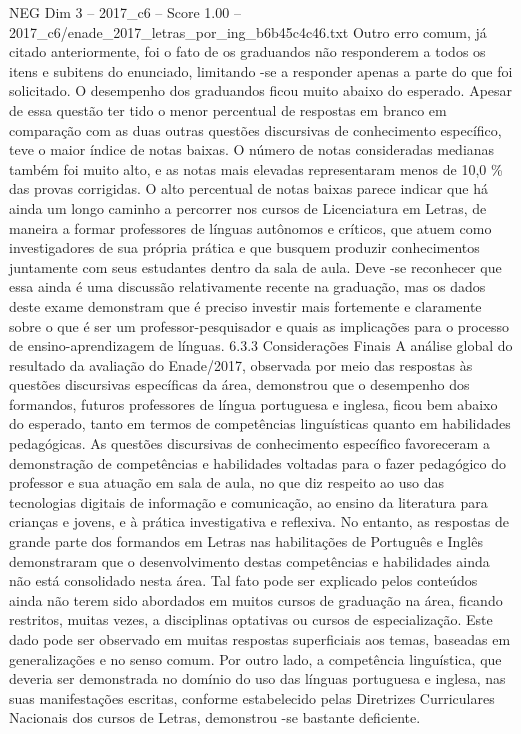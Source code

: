 \begin{textsample}{NEG Dim 3 – 2017\_c6 – Score 1.00 – 2017\_c6/enade\_2017\_letras\_por\_ing\_b6b45c4c46.txt}
Outro erro comum, já citado anteriormente, foi o fato de os graduandos não responderem a todos os itens e subitens do enunciado, limitando -se a responder apenas a parte do que foi solicitado.
O desempenho dos graduandos ficou muito abaixo do esperado.
Apesar de essa questão ter tido o menor percentual de respostas em branco em comparação com as duas outras questões discursivas de conhecimento específico, teve o maior índice de notas baixas.
O número de notas consideradas medianas também foi muito alto, e as notas mais elevadas representaram menos de 10,0 \% das provas corrigidas.
O alto percentual de notas baixas parece indicar que há ainda um longo caminho a percorrer nos cursos de Licenciatura em Letras, de maneira a formar professores de línguas autônomos e críticos, que atuem como investigadores de sua própria prática e que busquem produzir conhecimentos juntamente com seus estudantes dentro da sala de aula.
Deve -se reconhecer que essa ainda é uma discussão relativamente recente na graduação, mas os dados deste exame demonstram que é preciso investir mais fortemente e claramente sobre o que é ser um professor-pesquisador e quais as implicações para o processo de ensino-aprendizagem de línguas. 6.3.3 Considerações Finais A análise global do resultado da avaliação do Enade/2017, observada por meio das respostas às questões discursivas específicas da área, demonstrou que o desempenho dos formandos, futuros professores de língua portuguesa e inglesa, ficou bem abaixo do esperado, tanto em termos de competências linguísticas quanto em habilidades pedagógicas.
As questões discursivas de conhecimento específico favoreceram a demonstração de competências e habilidades voltadas para o fazer pedagógico do professor e sua atuação em sala de aula, no que diz respeito ao uso das tecnologias digitais de informação e comunicação, ao ensino da literatura para crianças e jovens, e à prática investigativa e reflexiva.
No entanto, as respostas de grande parte dos formandos em Letras nas habilitações de Português e Inglês demonstraram que o desenvolvimento destas competências e habilidades ainda não está consolidado nesta área.
Tal fato pode ser explicado pelos conteúdos ainda não terem sido abordados em muitos cursos de graduação na área, ficando restritos, muitas vezes, a disciplinas optativas ou cursos de especialização.
Este dado pode ser observado em muitas respostas superficiais aos temas, baseadas em generalizações e no senso comum.
Por outro lado, a competência linguística, que deveria ser demonstrada no domínio do uso das línguas portuguesa e inglesa, nas suas manifestações escritas, conforme estabelecido pelas Diretrizes Curriculares Nacionais dos cursos de Letras, demonstrou -se bastante deficiente.

\end{textsample}
